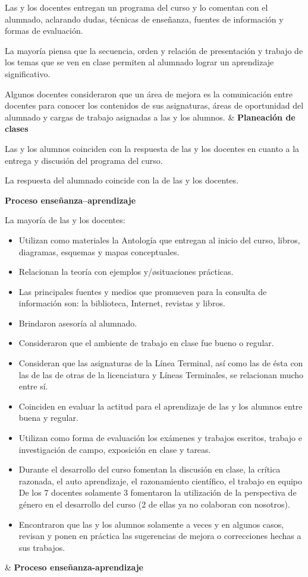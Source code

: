 \begin{center}
\begin{tiny}
\begin{longtabu*}
Las y los docentes entregan un programa del curso y lo comentan con el
alumnado, aclarando dudas, técnicas de enseñanza, fuentes de información y formas 
de evaluación. 

La mayoría piensa que la secuencia, orden y relación de presentación y
trabajo de los temas que se ven en clase permiten al alumnado lograr un aprendizaje significativo. 

Algunos docentes consideraron que un área de mejora es la comunicación
entre docentes para conocer los contenidos de sus asignaturas, áreas de oportunidad del alumnado y 
cargas de trabajo asignadas a las y los alumnos. 
&
{\bfseries Planeación de clases}

Las y los alumnos coinciden con la respuesta de las y los docentes en
cuanto a la entrega y discusión del programa del curso.  

La respuesta del alumnado coincide con la de las y los docentes.\\
\addlinespace 
 
 {\bfseries Proceso enseñanza–aprendizaje}

La mayoría de las y los docentes:

\begin{itemize}
\item Utilizan como materiales la Antología que entregan al inicio del
curso, libros, diagramas, esquemas y mapas conceptuales. 
\item  Relacionan la teoría con ejemplos y\slash\o situaciones
prácticas.
\item  Las principales fuentes y medios que promueven para la consulta
de información son: la biblioteca, Internet, revistas y libros. 
\item Brindaron asesoría al alumnado.
\item Consideraron que el ambiente de trabajo en clase fue bueno o
regular.
\item  Consideran que las asignaturas de la Línea Terminal, así como las
de ésta con las de las de otras de la licenciatura y Líneas Terminales, se relacionan mucho entre sí. 
\item Coinciden en evaluar la actitud para el aprendizaje de las y los
alumnos entre buena y regular. 
\item  Utilizan como forma de evaluación los exámenes y trabajos
escritos, trabajo e investigación de campo, exposición en clase y tareas. 
\item  Durante el desarrollo del curso fomentan la discusión en clase,
la crítica razonada, el auto aprendizaje, el razonamiento científico, el trabajo en equipo De los 7 docentes solamente
3 fomentaron la utilización de la perspectiva de género en el desarrollo del curso (2 de ellas ya no colaboran con
nosotros).
\item  Encontraron que las y los alumnos solamente a veces y en algunos
casos, revisan y ponen en práctica las sugerencias de mejora o correcciones hechas a sus trabajos.
\end{itemize}
&
{\bf Proceso enseñanza-aprendizaje}


\end{longtabu*}
\end{tiny}
\end{center}
